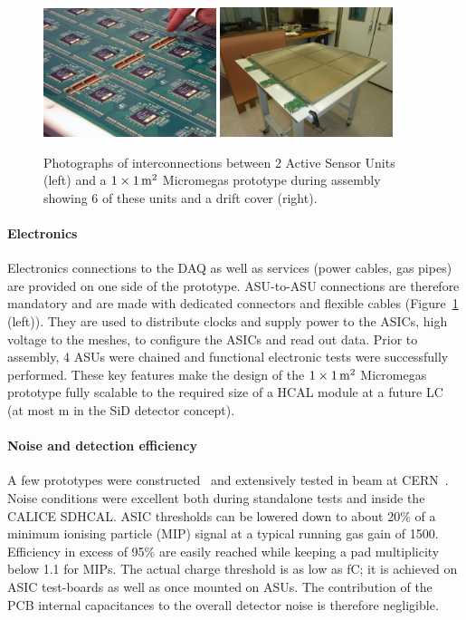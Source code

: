 \begin{figure}
\begin{centering}
\includegraphics[width=0.45\textwidth]{Calorimeter/SDHCal/interconnects}
\includegraphics[width=0.45\textwidth]{Calorimeter/SDHCal/m2_assembly}
\caption{Photographs of interconnections between 2 Active Sensor Units (left) and a $1\times \unit[1]{m^{2}}$ Micromegas prototype during assembly showing 6 of these units and a drift cover (right).}
\label{mecha_elec}
\end{centering}
\end{figure}


\paragraph{Electronics}
Electronics connections to the DAQ as well as services (power cables, gas pipes) are provided on one side of the prototype. ASU-to-ASU connections are therefore mandatory and are made with dedicated connectors and flexible cables (Figure~\ref{mecha_elec} (left)). They are used to distribute clocks and supply power to the ASICs, high voltage to the meshes, to configure the ASICs and read out data. Prior to assembly, 4 ASUs were chained and functional electronic tests were successfully performed. These key features make the design of the $1\times \unit[1]{m^{2}}$ Micromegas prototype fully scalable to the required size of a HCAL module at a future LC (at most \unit[2]{m} in the SiD detector concept).

\paragraph{Noise and detection efficiency}
A few prototypes were constructed~\cite{Adloff201390} and extensively tested in beam at CERN~\cite{Adloff:2014qea}. Noise conditions were excellent both during standalone tests and inside the CALICE SDHCAL. ASIC thresholds can be lowered down to about 20\% of a minimum ionising particle (MIP) signal at a typical running gas gain of 1500. Efficiency in excess of 95\% are easily reached while keeping a pad multiplicity below 1.1 for MIPs. The actual charge threshold is as low as \unit[1--2]{fC}; it is achieved on ASIC test-boards as well as once mounted on ASUs. The contribution of the PCB internal capacitances to the overall detector noise is therefore negligible.

